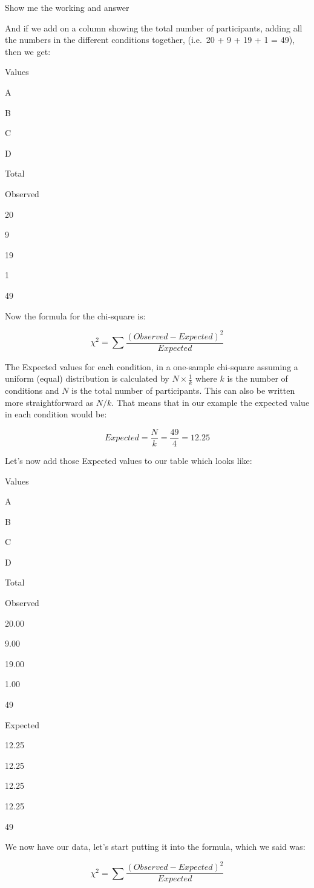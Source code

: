 \documentclass[
  oneside]{book}
\begin{document}
Show me the working and answer

And if we add on a column showing the total number of participants, adding all the numbers in the different conditions together, (i.e.~20 + 9 + 19 + 1 = 49), then we get:

Values

A

B

C

D

Total

Observed

20

9

19

1

49

Now the formula for the chi-square is:

\[\chi^2 = \sum\frac{(Observed - Expected)^2}{Expected}\]

The Expected values for each condition, in a one-sample chi-square assuming a uniform (equal) distribution is calculated by \(N \times \frac{1}{k}\) where \(k\) is the number of conditions and \(N\) is the total number of participants. This can also be written more straightforward as \(N/k\). That means that in our example the expected value in each condition would be:

\[Expected = \frac{N}{k} = \frac{49}{4} = 12.25\]

Let's now add those Expected values to our table which looks like:

Values

A

B

C

D

Total

Observed

20.00

9.00

19.00

1.00

49

Expected

12.25

12.25

12.25

12.25

49

We now have our data, let's start putting it into the formula, which we said was:

\[\chi^2 = \sum\frac{(Observed - Expected)^2}{Expected}\]
\end{document}
